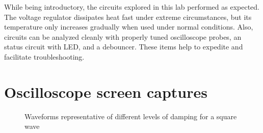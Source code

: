 \documentclass[11pt]{article}
\begin{document}
While being introductory, the circuits explored in this lab performed as expected. The voltage regulator dissipates heat fast under extreme circumstances, but its temperature only increases gradually when used under normal conditions. Also, circuits can be analyzed cleanly with properly tuned oscilloscope probes, an status circuit with LED, and a debouncer. These items help to expedite and facilitate troubleshooting.

\section*{Oscilloscope screen captures}

\begin{figure}
	\centering
	\caption{Waveforms representative of different levels of damping for a square wave}
	\label{fig:damping}
\end{figure}
\end{document}
